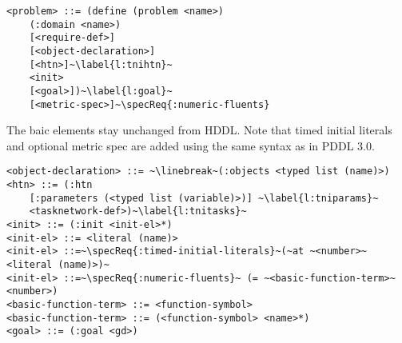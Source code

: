 \documentclass[letterpaper]{article} %
\begin{document}
\begin{lstlisting}[firstnumber=last, escapechar=~]
<problem> ::= (define (problem <name>)
    (:domain <name>)
    [<require-def>]
    [<object-declaration>]
    [<htn>]~\label{l:tnihtn}~
    <init>
    [<goal>])~\label{l:goal}~
    [<metric-spec>]~\specReq{:numeric-fluents}
\end{lstlisting}

The baic elements stay unchanged from HDDL. Note that timed initial literals and optional metric spec are added using the same syntax as in PDDL 3.0.

\begin{lstlisting}[firstnumber=last, escapechar=~]
<object-declaration> ::= ~\linebreak~(:objects <typed list (name)>)
<htn> ::= (:htn
    [:parameters (<typed list (variable)>)] ~\label{l:tniparams}~
    <tasknetwork-def>)~\label{l:tnitasks}~
<init> ::= (:init <init-el>*)
<init-el> ::= <literal (name)>
<init-el> ::=~\specReq{:timed-initial-literals}~(~at ~<number>~ <literal (name)>)~
<init-el> ::=~\specReq{:numeric-fluents}~ (= ~<basic-function-term>~ <number>)
<basic-function-term> ::= <function-symbol>
<basic-function-term> ::= (<function-symbol> <name>*)
<goal> ::= (:goal <gd>)
\end{lstlisting} %

%
%



\end{document}
